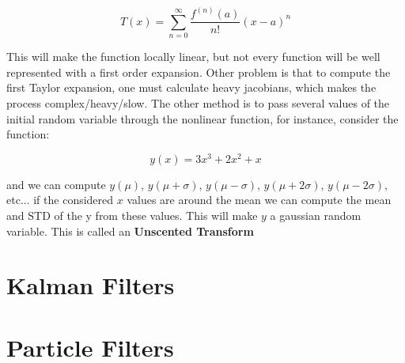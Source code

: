 \begin{equation}
    T(x) = \sum_{n=0}^{\infty} \frac{f^{(n)}(a)}{n!}(x-a)^n
\end{equation}


This will make the function locally linear, but not every function will be well represented with a first order expansion. Other problem is that to compute the first Taylor expansion, one must calculate heavy jacobians, which makes the process complex/heavy/slow.
The other method is to pass several values of the initial random variable through the nonlinear function, for instance, consider the function:

\begin{equation}
    y(x) = 3x^3 + 2x^2 + x
\end{equation}

and we can compute $y(\mu)$, $y(\mu+\sigma)$, $y(\mu-\sigma)$, $y(\mu+2\sigma)$, $y(\mu-2\sigma)$, etc... if the considered $x$ values are around the mean we can compute the mean and \acs*{STD} of the y from these values. This will make $y$ a gaussian random variable. This is called an \textbf{Unscented Transform}


\section{Kalman Filters}



\section{Particle Filters}